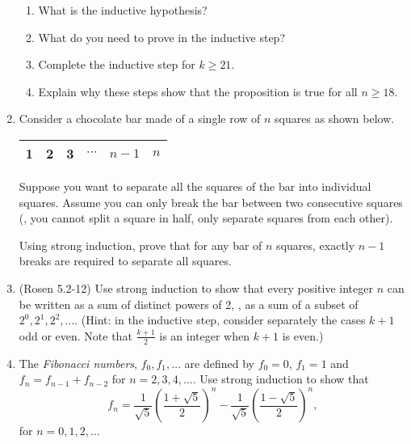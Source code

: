 \begin{enumerate}
\begin{enumerate}
\item \streasy What is the inductive hypothesis?

\item \streasy What do you need to prove in the inductive step?

\item \strmedium Complete the inductive step for $k \geq 21$.
  
\item \strmedium Explain why these steps show that the proposition is true for all $n \geq 18$.
\end{enumerate}

\item \streasy Consider a chocolate bar made of a single row of $n$ squares as shown below.

\begin{center}
\begin{tabular}{|C{8mm}||C{8mm}||C{8mm}||C{8mm}||C{8mm}||C{8mm}|}
 & 2 & 3 & $\cdots$ & $n{-}1$ & $n$ \\
\hline 
\end{tabular}
\end{center}

Suppose you want to separate all the squares of the bar into individual squares. Assume you can only break the bar between two consecutive squares (\ie, you cannot split a square in half, only separate squares from each other).

Using strong induction, prove that for any bar of $n$ squares, exactly $n-1$ breaks are required to separate all squares.

\item \strhard (Rosen 5.2-12) Use strong induction to show that every positive integer $n$ can be written as a sum of distinct powers of 2, \ie, as a sum of a subset of $2^0, 2^1, 2^2, \dots$. 
(Hint: in the inductive step, consider separately the cases $k+1$ odd or even. Note that $\frac{k+1}{2}$ is an integer when $k+1$ is even.)

\item \strmedium The \textit{Fibonacci numbers}, $f_{0},f_{1},\dots$ are defined by $f_{0}=0$, $f_{1}=1$ and $f_{n}=f_{n-1}+f_{n-2}$ for $n=2,3,4,\dots$. Use strong induction to show that
\begin{equation*}
f_n=\frac{1}{\sqrt{5}}\left(\frac{1+\sqrt{5}}{2}\right)^{n}
- \frac{1}{\sqrt{5}}\left(\frac{1-\sqrt{5}}{2}\right)^{n},
\end{equation*}
for $n=0,1,2,\dots$
\end{enumerate}


